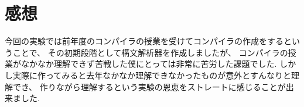 \documentclass[a4j,dvipdfmx]{jarticle}
\begin{document}
\section{感想}
今回の実験では前年度のコンパイラの授業を受けてコンパイラの作成をするということで、
その初期段階として構文解析器を作成しましたが、
コンパイラの授業がなかなか理解できず苦戦した僕にとっては非常に苦労した課題でした.
しかし実際に作ってみると去年なかなか理解できなかったものが意外とすんなりと理解でき、
作りながら理解するという実験の恩恵をストレートに感じることが出来ました.
\end{document}
